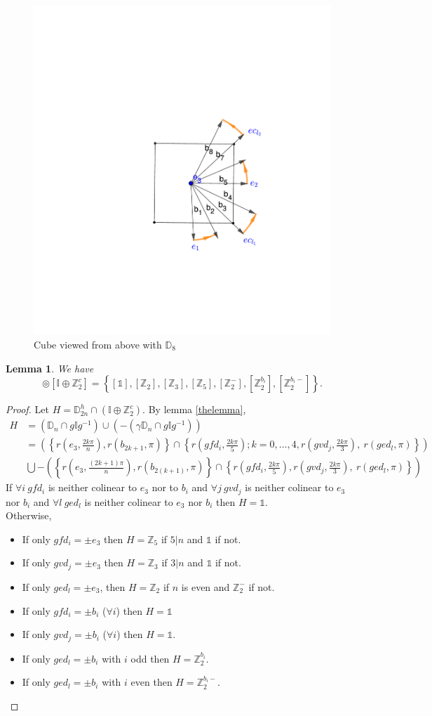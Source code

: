 \documentclass[11pt,a4paper]{amsart}
\newtheorem{lem}[thm]{Lemma}
\theoremstyle{definition}
\newcommand{\ZZ}{\mathbb{Z}}                %
\newcommand{\ico}{\mathbb{I}}               %
\newcommand{\DD}{\mathbb{D}}                %
\newcommand{\1}{\mathds{1}}		            %
\newcommand{\set}[1]{\left\{#1\right\}}     %
\begin{document}
\begin{figure}
		\centering \includegraphics[width=0.5\linewidth]{"Figures piezo/geogebra-export"}
		\caption{Cube viewed from above with $\DD_8$}
		\label{fig:graphe21}
\end{figure}

\begin{lem}
We have
\begin{equation*}
[\DD_{2n}^{h}] \circledcirc
 [\ico \oplus \ZZ_2^c]=\set{[\1],[\ZZ_2],[\ZZ_3],[\ZZ_5],[\ZZ_2^-],[\ZZ_{2}^{b_i}],[\ZZ_{2}^{b_i-}]}.
\end{equation*}
\end{lem}
\begin{proof}
Let $H=\DD_{2n}^h \cap (\ico \oplus \ZZ_2^c)$.
By lemma \ref{thelemma},
\begin{align*}
H&=(\DD_n\cap g \ico g^{-1})\cup (-(\gamma\DD_n\cap g \ico g^{-1}))\\
&=\left(\set{r(e_3,\frac{2k\pi}{n}),r(b_{2k+1},\pi)}\cap \set{r(gfd_i,\frac{2k\pi}{5});k=0,\dotsc,4,r(gvd_j,\frac{2k\pi}{3}),\ r(ged_l,\pi)}\right)\\
&\bigcup-\left(\set{r(e_3,\frac{(2k+1)\pi}{n}),r(b_{2(k+1)},\pi)}\cap \set{r(gfd_i,\frac{2k\pi}{5}),r(gvd_j,\frac{2k\pi}{3}),\ r(ged_l,\pi)}\right)
\end{align*}
If $\forall i\ gfd_i$ is neither colinear to $e_3$ nor to $b_i$ and $\forall j\ gvd_j$ is neither colinear to $e_3$ nor $b_i$ and $\forall l\ ged_l$ is neither colinear to $e_3$ nor $b_i$ then $H=\1$.\\
Otherwise,
\begin{itemize}
\item If only $gfd_i=\pm e_3$ then $H=\ZZ_5$ if $5|n$ and $\1$ if not.
\item If only $gvd_j=\pm e_3$ then $H=\ZZ_3$ if $3|n$ and $\1$ if not.
\item If only $ged_l=\pm e_3$, then $H=\ZZ_2$ if $n$ is even and $\ZZ_2^-$ if not.
\item If only $gfd_i=\pm b_i$ ($\forall i $) then $H=\1$
\item If only $gvd_j=\pm b_i$ ($\forall i $) then $H=\1$.
\item If only $ged_l=\pm b_i$ with $i$ odd then $H=\ZZ_2^{b_i}.$
\item If only $ged_l=\pm b_i$ with $i$ even then $H=\ZZ_2^{b_i-}.$
\end{itemize}
\end{proof}
\end{document}
